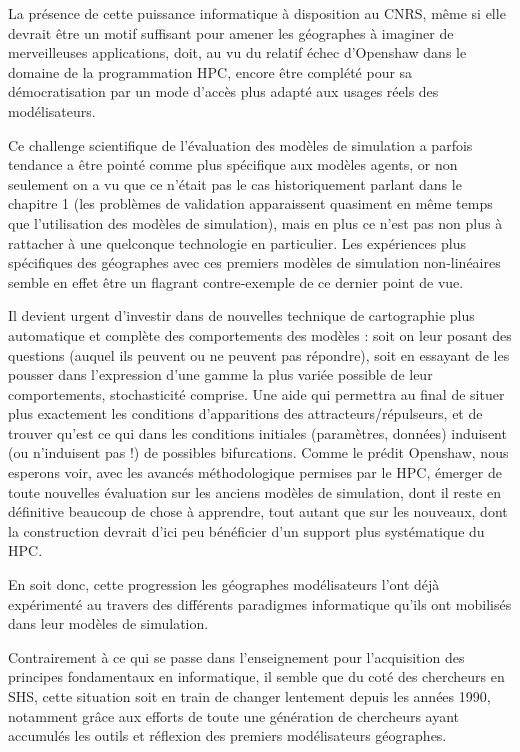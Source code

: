 La présence de cette puissance informatique à disposition au CNRS, même si elle devrait être un motif suffisant pour amener les géographes à imaginer de merveilleuses applications, doit, au vu du relatif échec d'Openshaw dans le domaine de la programmation HPC, encore être complété pour sa démocratisation par un mode d'accès plus adapté aux usages réels des modélisateurs.


Ce challenge scientifique de l'évaluation des modèles de simulation a parfois tendance a être pointé comme plus spécifique aux modèles agents, or non seulement on a vu que ce n'était pas le cas historiquement parlant dans le chapitre 1 (les problèmes de validation apparaissent quasiment en même temps que l'utilisation des modèles de simulation), mais en plus ce n'est pas non plus à rattacher à une quelconque technologie en particulier. Les expériences plus spécifiques des géographes avec ces premiers modèles de simulation non-linéaires semble en effet être un flagrant contre-exemple de ce dernier point de vue.

Il devient urgent d'investir dans de nouvelles technique de cartographie plus automatique et complète des comportements des modèles : soit on leur posant des questions (auquel ils peuvent ou ne peuvent pas répondre), soit en essayant de les pousser dans l'expression d'une gamme la plus variée possible de leur comportements, stochasticité comprise. Une aide qui permettra au final de situer plus exactement les conditions d'apparitions des attracteurs/répulseurs, et de trouver qu'est ce qui dans les conditions initiales (paramètres, données) induisent (ou n'induisent pas !) de possibles bifurcations. Comme le prédit Openshaw, nous esperons voir, avec les avancés méthodologique permises par le HPC, émerger de toute nouvelles évaluation sur les anciens modèles de simulation, dont il reste en définitive beaucoup de chose à apprendre, tout autant que sur les nouveaux, dont la construction devrait d'ici peu bénéficier d'un support plus systématique du HPC.

En soit donc, cette progression les géographes modélisateurs l'ont déjà expérimenté au travers des différents paradigmes informatique qu'ils ont mobilisés dans leur modèles de simulation.

Contrairement à ce qui se passe dans l'enseignement pour l'acquisition des principes fondamentaux en informatique, il semble que du coté des chercheurs en SHS, cette situation soit en train de changer lentement depuis les années 1990, notamment grâce aux efforts de toute une génération de chercheurs ayant accumulés les outils et réflexion des premiers modélisateurs géographes.

